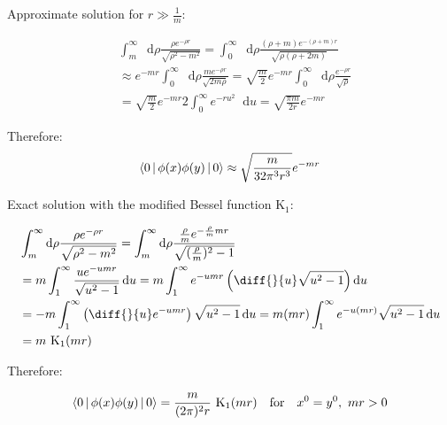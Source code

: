 \documentclass{beamer}
\newcommand{\di}[1]{\diff{}{#1}}
\newcommand{\diffop}{\mathop{}\!\mathrm{d}}
\newcommand{\du}{\diffop u}
\newcommand{\drho}{\diffop \rho}
\newcommand{\phixy}{\Braket{0|\phi(x)\phi(y)|0}}
\newcommand{\cintegral}{\int_m^\infty \drho \frac{\rho e^{-\rho r}}{\sqrt{\rho^2 - m^2}}}
\begin{document}
\begin{frame}
Approximate solution for $r \gg \frac{1}{m}$:

\begin{equation*}
\begin{split}
&\cintegral = \int_0^\infty \drho \frac{(\rho + m)e^{-(\rho + m)r}}{\sqrt{\rho(\rho + 2m)}} \\
&\approx e^{-mr} \int_0^\infty \drho \frac{m e^{-\rho r}}{\sqrt{2m\rho}}
= \sqrt{\frac{m}{2}} e^{-mr} \int_0^\infty \drho \frac{e^{-\rho r}}{\sqrt{\rho}} \\
&= \sqrt{\frac{m}{2}} e^{-mr} 2 \int_0^\infty e^{-ru^2} \du = \sqrt{\frac{\pi m}{2r}} e^{-mr}
\end{split}
\end{equation*}

Therefore:
\begin{equation*}
\phixy \approx \sqrt{\frac{m}{32\pi^3 r^3}} e^{-mr}
\end{equation*}

\end{frame}


\begin{frame}
Exact solution with the modified Bessel function $\mathrm{K}_1$:

\begin{equation*}
\begin{split}
&\cintegral =
\int_m^\infty \drho \frac{\frac{\rho}{m} e^{-\frac{\rho}{m} mr}}{\sqrt{(\frac{\rho}{m})^2 - 1}} \\
&= m \int_1^\infty \frac{u e^{-umr}}{\sqrt{u^2 - 1}} \du = m \int_1^\infty e^{-umr} \left( \di{u} \sqrt{u^2 - 1} \right) \du \\
&= -m \int_1^\infty \left( \di{u} e^{-umr} \right) \sqrt{u^2 - 1} \du = m(mr) \int_1^\infty e^{-u(mr)} \sqrt{u^2 - 1} \du \\
&= m \  \mathrm{K}_1(mr)
\end{split}
\end{equation*}

Therefore:

\begin{equation*}
\phixy = \frac{m}{(2\pi)^2 r} \  \mathrm{K}_1(mr) \quad \textrm{for} \quad x^0 = y^0,\ mr > 0
\end{equation*}
\end{frame}
\end{document}
